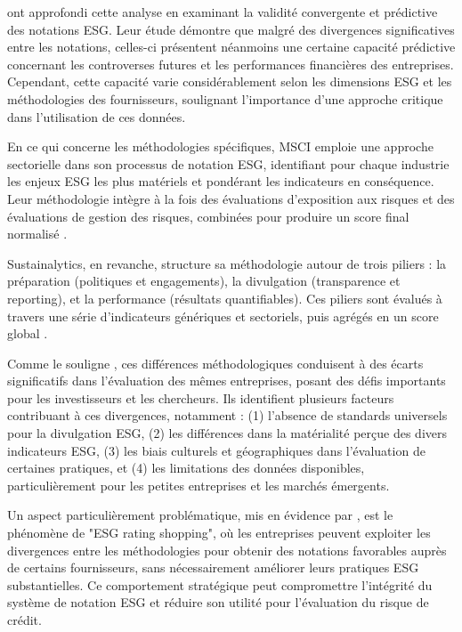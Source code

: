  ont approfondi cette analyse en examinant la validité convergente et prédictive des notations ESG. Leur étude démontre que malgré des divergences significatives entre les notations, celles-ci présentent néanmoins une certaine capacité prédictive concernant les controverses futures et les performances financières des entreprises. Cependant, cette capacité varie considérablement selon les dimensions ESG et les méthodologies des fournisseurs, soulignant l'importance d'une approche critique dans l'utilisation de ces données.

En ce qui concerne les méthodologies spécifiques, MSCI emploie une approche sectorielle dans son processus de notation ESG, identifiant pour chaque industrie les enjeux ESG les plus matériels et pondérant les indicateurs en conséquence. Leur méthodologie intègre à la fois des évaluations d'exposition aux risques et des évaluations de gestion des risques, combinées pour produire un score final normalisé \citep{comstock2017}.

Sustainalytics, en revanche, structure sa méthodologie autour de trois piliers : la préparation (politiques et engagements), la divulgation (transparence et reporting), et la performance (résultats quantifiables). Ces piliers sont évalués à travers une série d'indicateurs génériques et sectoriels, puis agrégés en un score global \citep{vanderlugt2019}.

Comme le souligne \citet{kotsantonis2019}, ces différences méthodologiques conduisent à des écarts significatifs dans l'évaluation des mêmes entreprises, posant des défis importants pour les investisseurs et les chercheurs. Ils identifient plusieurs facteurs contribuant à ces divergences, notamment : (1) l'absence de standards universels pour la divulgation ESG, (2) les différences dans la matérialité perçue des divers indicateurs ESG, (3) les biais culturels et géographiques dans l'évaluation de certaines pratiques, et (4) les limitations des données disponibles, particulièrement pour les petites entreprises et les marchés émergents.

Un aspect particulièrement problématique, mis en évidence par \citet{dimson2020}, est le phénomène de "ESG rating shopping", où les entreprises peuvent exploiter les divergences entre les méthodologies pour obtenir des notations favorables auprès de certains fournisseurs, sans nécessairement améliorer leurs pratiques ESG substantielles. Ce comportement stratégique peut compromettre l'intégrité du système de notation ESG et réduire son utilité pour l'évaluation du risque de crédit.

